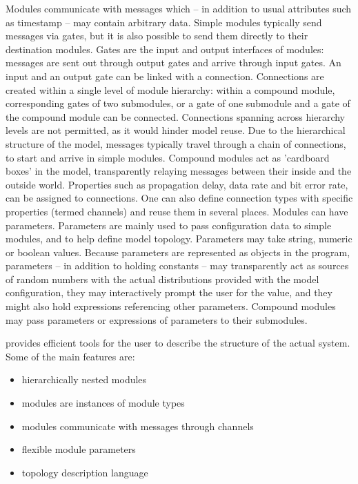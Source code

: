 Modules communicate with messages which -- in addition to
usual attributes such as timestamp -- may contain arbitrary
data. Simple modules typically send messages via gates, but it is also
possible to send them directly to their destination modules. Gates are the
input and output interfaces of modules: messages are sent out through
output gates and arrive through input gates. An input and an output gate
can be linked with a connection. Connections are created within a single
level of module hierarchy: within a compound module, corresponding gates of
two submodules, or a gate of one submodule and a gate of the compound
module can be connected. Connections spanning across hierarchy levels are
not permitted, as it would hinder model reuse. Due to the hierarchical
structure of the model, messages typically travel through a chain of
connections, to start and arrive in simple modules. Compound modules act as
'cardboard boxes' in the model, transparently relaying messages between
their inside and the outside world. Properties such as propagation delay,
data rate and bit error rate, can be assigned to connections. One can also
define connection types with specific properties (termed channels) and
reuse them in several places. Modules can have parameters. Parameters are
mainly used to pass configuration data to simple modules, and to help
define model topology. Parameters may take string, numeric or boolean
values. Because parameters are represented as objects in the program,
parameters -- in addition to holding constants -- may transparently act as
sources of random numbers with the actual distributions provided with the
model configuration, they may interactively prompt the user for the value,
and they might also hold expressions referencing other parameters. Compound
modules may pass parameters or expressions of parameters to their
submodules.






{\opp} provides efficient tools for the user to describe the
structure of the actual system. Some of the main features are:
\begin{itemize}
\item{hierarchically nested modules}
\item{modules are instances of module types}
\item{modules communicate with messages through channels}
\item{flexible module parameters}
\item{topology description language}
\end{itemize}

